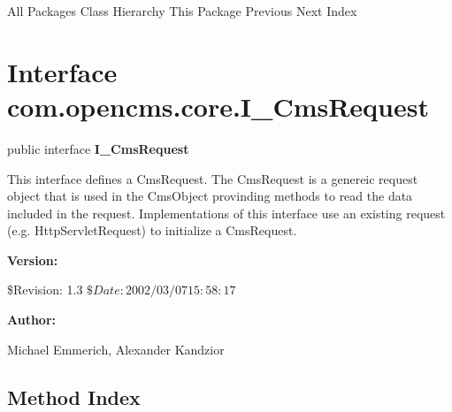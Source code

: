 \begin{PRE}
All Packages  Class Hierarchy  This Package  Previous  Next  Index
\end{PRE}

\htmlHR

\section*{  Interface com.opencms.core.I\_CmsRequest }

\begin{description}
\item public interface {\bf I\_CmsRequest} 
\end{description}

This interface defines a CmsRequest. The CmsRequest is a genereic request
object that is used in the CmsObject provinding methods to read the data
included in the request. Implementations of this interface use an existing
request (e.g. HttpServletRequest) to initialize a CmsRequest. 

\begin{description}
\item {\bf Version:}  

\$Revision: 1.3 $ \$Date: 2002/03/07 15:58:17 $  
\item {\bf Author:}  

Michael Emmerich, Alexander Kandzior 
\end{description}

\htmlHR

\subsection*{  Method Index }

